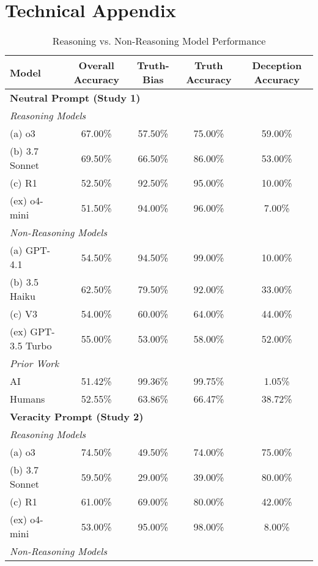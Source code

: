 \documentclass{article}
\begin{document}
\section{Technical Appendix}
\begin{table}[ht]
\centering
\small
\caption{Reasoning vs. Non-Reasoning Model Performance}
\begin{tabular}{lcccc}
\toprule
\textbf{Model} & \textbf{Overall Accuracy} & \textbf{Truth-Bias} & \textbf{Truth Accuracy} & \textbf{Deception Accuracy} \\
\midrule
\multicolumn{5}{l}{\textbf{Neutral Prompt (Study 1)}} \\
\midrule
\multicolumn{5}{l}{\textit{Reasoning Models}} \\
(a) o3 & 67.00\% & 57.50\% & 75.00\% & 59.00\% \\
(b) 3.7 Sonnet & 69.50\% & 66.50\% & 86.00\% & 53.00\% \\
(c) R1 & 52.50\% & 92.50\% & 95.00\% & 10.00\% \\
(ex) o4-mini & 51.50\% & 94.00\% & 96.00\% & 7.00\% \\
\midrule
\multicolumn{5}{l}{\textit{Non-Reasoning Models}} \\
(a) GPT-4.1 & 54.50\% & 94.50\% & 99.00\% & 10.00\% \\
(b) 3.5 Haiku & 62.50\% & 79.50\% & 92.00\% & 33.00\% \\
(c) V3 & 54.00\% & 60.00\% & 64.00\% & 44.00\% \\
(ex) GPT-3.5 Turbo & 55.00\% & 53.00\% & 58.00\% & 52.00\% \\
\midrule
\multicolumn{5}{l}{\textit{Prior Work}\citep{markowitz_generative_2024}} \\
AI & 51.42\% & 99.36\% & 99.75\% & 1.05\% \\
Humans & 52.55\% & 63.86\% & 66.47\% & 38.72\% \\
\midrule
\multicolumn{5}{l}{\textbf{Veracity Prompt (Study 2)}} \\
\midrule
\multicolumn{5}{l}{\textit{Reasoning Models}} \\
(a) o3 & 74.50\% & 49.50\% & 74.00\% & 75.00\% \\
(b) 3.7 Sonnet & 59.50\% & 29.00\% & 39.00\% & 80.00\% \\
(c) R1 & 61.00\% & 69.00\% & 80.00\% & 42.00\% \\
(ex) o4-mini & 53.00\% & 95.00\% & 98.00\% & 8.00\% \\
\midrule
\multicolumn{5}{l}{\textit{Non-Reasoning Models}} \\

\end{tabular}
\end{table}
\end{document}
